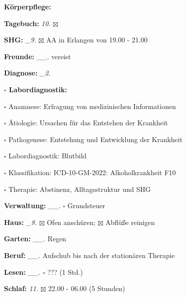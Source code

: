 \documentclass[10pt,a4paper]{article}
\newcommand\prop[1] {{\color {alizarin} {\bf #1}}}             %
\newcommand\mand[1] {{\color {burntorange} {\bf #1}}}          %
\newcommand\topspace{\vskip -15pt \hskip 20pt}
\newcommand\bottomspace{\vskip 4pt}
\newcommand\n[1] { {\sl #1.} \hskip 5pt }
\begin{document}
\begin{mdframed}[style=daystyle]
\begin{labeling}{{\mand {Körperpflege:}}}
    \bottomspace    
  \item[{\mand {Tagebuch:}}]       \n{10} $\boxtimes$
  \item[{\mand {SHG:}}]           \n{\_9} $\boxtimes$ AA in Erlangen von 19.00 - 21.00
  \item[{\mand {Freunde:}}]      \n{\_\_} vereist
  \item[{\mand {Diagnose:}}]      \n{\_2}
    \topspace
    \begin{minipage}{0.75\textwidth}  
      \begin{labeling}{{\prop {$\square$ Labordiagnostik:}}} 
        \setlength\itemsep{-3pt}
      \item[$\square$ Anamnese:]        Erfragung von medizinischen Informationen
      \item[$\square$ Ätiologie:]       Ursachen für das Entstehen der Krankheit
      \item[$\square$ Pathogenese:]     Entstehung und Entwicklung der Krankheit
      \item[$\square$ Labordiagnostik:] Blutbild
      \item[$\square$ Klassifikation:]  ICD-10-GM-2022: Alkoholkrankheit F10
      \item[$\square$ Therapie:]        Abstinenz, Alltagsstruktur und SHG
      \end{labeling}
    \end{minipage}
    \bottomspace
  \item[{\mand {Verwaltung:}}]   \n{\_\_} $\square$ Grundsteuer
  \item[{\mand {Haus:}}]          \n{\_8} $\boxtimes$ Ofen anschüren; $\boxtimes$ Abflüße reinigen
  \item[{\mand {Garten:}}]       \n{\_\_} Regen
  \item[{\mand {Beruf:}}]        \n{\_\_} Aufschub bis nach der stationären Therapie
  \item[{\mand {Lesen:}}]        \n{\_\_} $\square$ ??? (1 Std.)
  \item[{\mand {Schlaf:}}]         \n{11} $\boxtimes$ 22.00 - 06.00 (5 Stunden)
  \end{labeling}


\end{mdframed}
\end{document}

